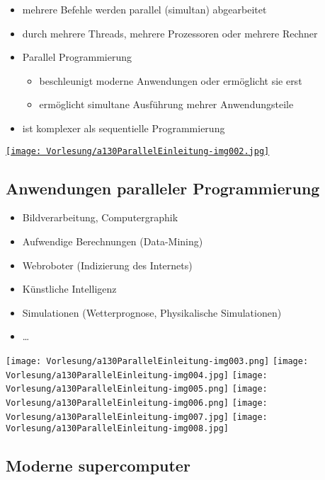 \begin{itemize}
\item mehrere Befehle werden parallel (simultan) abgearbeitet
\item durch mehrere Threads, mehrere Prozessoren oder mehrere Rechner
\item Parallel Programmierung

\begin{itemize}
\item beschleunigt moderne Anwendungen oder ermöglicht sie erst
\item ermöglicht simultane Ausführung mehrer Anwendungsteile
\end{itemize}
\item ist komplexer als sequentielle Programmierung
\end{itemize}
\begin{center}
\href{http://journal.frontiersin.org/article/10.3389/fnhum.2014.00641/full}{ \texttt{[image: Vorlesung/a130ParallelEinleitung-img002.jpg]} }
\end{center}

\subsection{Anwendungen paralleler Programmierung}

\begin{itemize}
\item Bildverarbeitung, Computergraphik
\item Aufwendige Berechnungen (Data-Mining)
\item Webroboter (Indizierung des Internets)
\item Künstliche Intelligenz
\item Simulationen (Wetterprognose, Physikalische Simulationen)
\item … 
\end{itemize}
\begin{center}
\texttt{[image: Vorlesung/a130ParallelEinleitung-img003.png]}  \texttt{[image: Vorlesung/a130ParallelEinleitung-img004.jpg]}  \texttt{[image: Vorlesung/a130ParallelEinleitung-img005.png]}  \texttt{[image: Vorlesung/a130ParallelEinleitung-img006.png]}  \texttt{[image: Vorlesung/a130ParallelEinleitung-img007.jpg]}  \texttt{[image: Vorlesung/a130ParallelEinleitung-img008.jpg]} 
\end{center}

\subsection{Moderne supercomputer}

